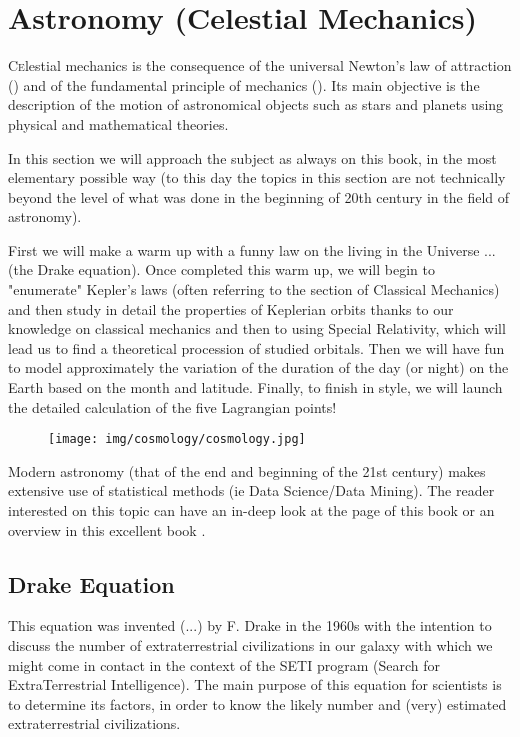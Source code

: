 	\newpage
	\thispagestyle{empty}
	\mbox{}
	\section{Astronomy (Celestial Mechanics)}\label{astronomy}
	\lettrine[lines=4]{\color{BrickRed}C}elestial mechanics is the consequence of the universal Newton's law of attraction () and of the fundamental principle of mechanics (). Its main objective is the description of the motion of astronomical objects such as stars and planets using physical and mathematical theories.
	
	In this section we will approach the subject as always on this book, in the most elementary  possible way (to this day the topics in this section are not technically beyond the level of what was done in the beginning of 20th century in the field of astronomy).
	
	First we will make a warm up with a funny law on the living in the Universe ... (the Drake equation). Once completed this warm up, we will begin to "enumerate" Kepler's laws (often referring to the section of Classical Mechanics) and then study in detail the properties of Keplerian orbits thanks to our knowledge on classical mechanics and then to using Special Relativity, which will lead us to find a theoretical procession of studied orbitals. Then we will have fun to model approximately the variation of the duration of the day (or night) on the Earth based on the month and latitude. Finally, to finish in style, we will launch the detailed calculation of the five Lagrangian points!
	
	\begin{figure}[H]
		\centering
		\texttt{[image: img/cosmology/cosmology.jpg]}
	\end{figure}
	
	\begin{tcolorbox}[title=Remark,colframe=black,arc=10pt]
	Modern astronomy (that of the end and beginning of the 21st century) makes extensive use of statistical methods (ie Data Science/Data Mining). The reader interested on this topic can have an in-deep look at the page \pageref{data mining} of this book or an overview in this excellent book \cite{feigelson2012modern}.
	\end{tcolorbox}
	
	\subsection{Drake Equation}
	This equation was invented (...) by F. Drake in the 1960s with the intention to discuss the number of extraterrestrial civilizations in our galaxy with which we might come in contact in the context of the SETI program (Search for ExtraTerrestrial Intelligence). The main purpose of this equation for scientists is to determine its factors, in order to know the likely number and (very) estimated extraterrestrial civilizations.
	
